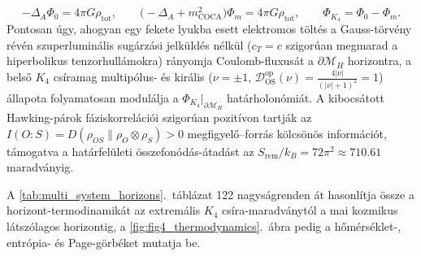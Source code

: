 \documentclass[11pt,a4paper]{article}
\theoremstyle{remark}
\begin{document}
\begin{itemize}
  \begin{equation}
    -\Delta_A \Phi_0 = 4\pi G\rho_{\mathrm{tot}}, \qquad \bigl(-\Delta_A + m_{\mathrm{COCA}}^2\bigr)\Phi_m = 4\pi G\rho_{\mathrm{tot}}, \qquad \Phi_{K_4} = \Phi_0 - \Phi_m.
    \label{eq:elliptic_gauss}
  \end{equation}
  Pontosan \'ugy, ahogyan egy fekete lyukba esett elektromos t\"olt\'es a Gauss-t\"orv\'eny r\'ev\'en szuperlumin\'alis sug\'arz\'asi jelk\"uld\'es n\'elk\"ul ($c_T = c$ szigor\'uan megmarad a hiperbolikus tenzorhull\'amokra) r\'anyomja Coulomb-fluxus\'at a $\partial\mathcal{M}_H$ horizontra, a bels\H{o} $K_4$ cs\'iramag multip\'olus- \'es kir\'alis ($\nu = \pm 1$, $\mathcal{D}_{\mathrm{OS}}^{\mathrm{op}}(\nu) = \frac{4|\nu|}{(|\nu|+1)^2} = 1$) \'allapota folyamatosan modul\'alja a $\Phi_{K_4}|_{\partial\mathcal{M}_H}$ hat\'arholon\'omi\'at. A kibocs\'atott Hawking-p\'arok f\'aziskorrel\'aci\'oi szigor\'uan pozit\'ivon tartj\'ak az $I(O:S) = D(\rho_{OS} \parallel \rho_O \otimes \rho_S) > 0$ megfigyel\H{o}--forr\'as k\"olcs\"on\"os inform\'aci\'ot, t\'amogatva a hat\'arfel\"uleti \"osszefon\'od\'as-\'atad\'ast az $S_{\mathrm{rem}}/k_B = 72\pi^2 \approx 710.61$ maradv\'anyig.
\end{itemize}

A \ref{tab:multi_system_horizons}.\ t\'abl\'azat 122 nagys\'agrenden \'at hasonl\'itja \"ossze a horizont-termodinamik\'at az extrem\'alis $K_4$ cs\'ira-maradv\'anyt\'ol a mai kozmikus l\'atsz\'olagos horizontig, a \ref{fig:fig4_thermodynamics}.\ \'abra pedig a h\H{o}m\'ers\'eklet-, entr\'opia- \'es Page-g\"orb\'eket mutatja be.
\end{document}
